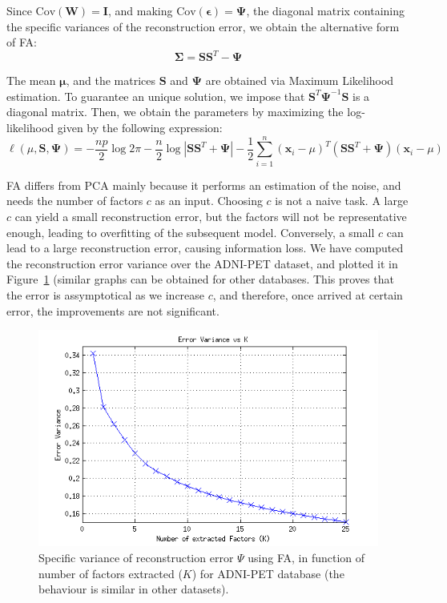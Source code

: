 Since $\text{Cov}(\mathbf{W}) = \mathbf{I}$, and making $\text{Cov}(\boldsymbol{\epsilon})=\boldsymbol{\Psi}$, the diagonal matrix containing the specific variances of the reconstruction error, we obtain the alternative form of \ac{FA}: 
\begin{equation}
\boldsymbol{\Sigma} = \mathbf{S}\mathbf{S}^T - \boldsymbol{\Psi}
\end{equation}

The mean $\boldsymbol{\mu}$, and the matrices $\mathbf{S}$ and $\boldsymbol{\Psi}$ are obtained via Maximum Likelihood estimation. To guarantee an unique solution, we impose that $\mathbf{S}^T\boldsymbol{\Psi}^{-1}\mathbf{S}$ is a diagonal matrix. Then, we obtain the parameters by maximizing the log-likelihood given by the following expression: 
\begin{equation}
	\ell(\mu,\mathbf{S},\boldsymbol{\Psi}) = - \frac{np}{2}\log{2\pi}- \frac{n}{2}\log{\left|\mathbf{SS}^T + \boldsymbol{\Psi}\right|} - \frac{1}{2}\sum_{i=1}^{n}(\mathbf{x}_i-\mu)^T(\mathbf{SS}^T+\boldsymbol{\Psi})(\mathbf{x}_i-\mu)
\end{equation} 

\ac{FA} differs from \ac{PCA} mainly because it performs an estimation of the noise, and needs the number of factors $c$ as an input. Choosing $c$ is not a naive task. A large $c$ can yield a small reconstruction error, but the factors will not be representative enough, leading to overfitting of the subsequent model. Conversely, a small $c$ can lead to a large reconstruction error, causing information loss. We have computed the reconstruction error variance over the ADNI-PET dataset, and plotted it in Figure~\ref{fig:error} (similar graphs can be obtained for other databases. This proves that the error is assymptotical as we increase $c$, and therefore, once arrived at certain error, the improvements are not significant. 

\begin{figure}[ht]
	\centering
	\includegraphics[width=0.5\linewidth]{Graphics/ch4/varError-K-ADNI}
	\caption{Specific variance of reconstruction error $\Psi$ using \ac{FA}, in function of number of factors extracted ($K$) for ADNI-PET database (the behaviour is similar in other datasets).}
	\label{fig:error}
\end{figure}


